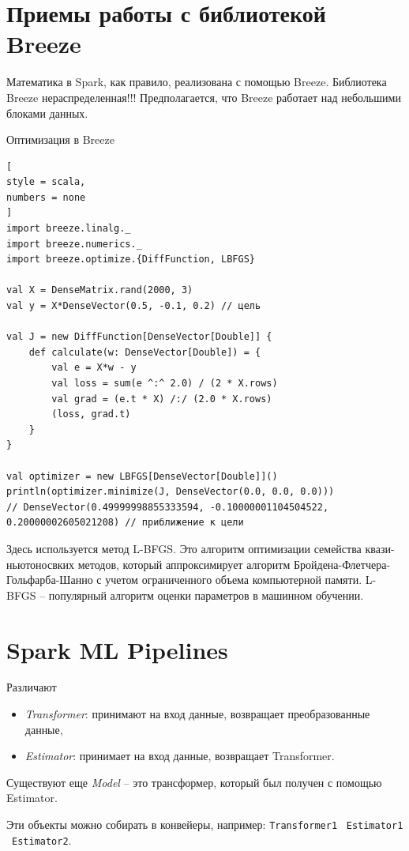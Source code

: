 \documentclass[%
	11pt,
	a4paper,
	utf8,
		]{article}
\begin{document}
\section{Приемы работы с библиотекой Breeze}

Математика в Spark, как правило, реализована с помощью Breeze. Библиотека Breeze нераспределенная!!! Предполагается, что Breeze работает над небольшими блоками данных.

Оптимизация в Breeze
\begin{lstlisting}[
style = scala,
numbers = none
]
import breeze.linalg._
import breeze.numerics._
import breeze.optimize.{DiffFunction, LBFGS}

val X = DenseMatrix.rand(2000, 3)
val y = X*DenseVector(0.5, -0.1, 0.2) // цель

val J = new DiffFunction[DenseVector[Double]] {
    def calculate(w: DenseVector[Double]) = {
        val e = X*w - y
        val loss = sum(e ^:^ 2.0) / (2 * X.rows)
        val grad = (e.t * X) /:/ (2.0 * X.rows)
        (loss, grad.t)
    }
}

val optimizer = new LBFGS[DenseVector[Double]]()
println(optimizer.minimize(J, DenseVector(0.0, 0.0, 0.0)))
// DenseVector(0.49999998855333594, -0.10000001104504522, 0.20000002605021208) // приближение к цели
\end{lstlisting}

Здесь используется метод L-BFGS. Это алгоритм оптимизации семейства квази-ньютоносвких методов, который аппроксимирует алгоритм Бройдена-Флетчера-Гольфарба-Шанно с учетом ограниченного объема компьютерной памяти. L-BFGS -- популярный алгоритм оценки параметров в машинном обучении.

\section{Spark ML Pipelines}

Различают
\begin{itemize}
	\item \emph{Transformer}: принимают на вход данные, возвращает преобразованные данные,
	
	\item \emph{Estimator}: принимает на вход данные, возвращает Transformer.
\end{itemize}

Существуют еще \emph{Model} -- это трансформер, который был получен с помощью Estimator.

Эти объекты можно собирать в конвейеры, например: \texttt{Transformer1} \textrightarrow\ \texttt{Estimator1} \textrightarrow\ \texttt{Estimator2}.
\end{document}
